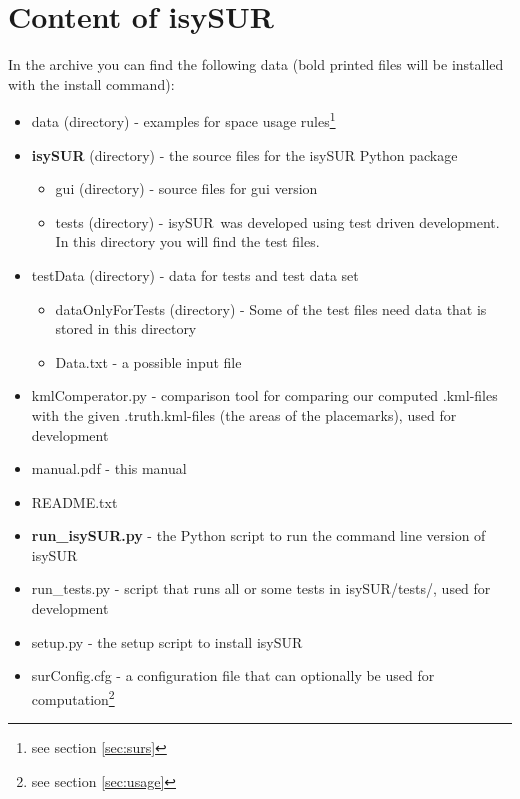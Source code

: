 \documentclass[11pt,fleqn]{book} %
\newcommand{\ProjectTitle}{isySUR}
\newcommand{\pt}{\ProjectTitle}
\begin{document}
\section{Content of \ProjectTitle}
In the archive you can find the following data (bold printed files will be installed with the install command):
\begin{itemize}
	\item data (directory) - examples for space usage rules\footnote{see section \ref{sec:surs}}
	\item \textbf{isySUR} (directory) - the source files for the isySUR Python package
	\begin{itemize}
		\item gui (directory) - source files for gui version
		\item tests (directory) - \pt\ was developed using test driven development. In this directory you will find the test files.
	\end{itemize}
	\item testData (directory) - data for tests and test data set
	\begin{itemize}
		\item dataOnlyForTests (directory) - Some of the test files need data that is stored in this directory
		\item Data.txt - a possible input file
	\end{itemize}
	\item kmlComperator.py - comparison tool for comparing our computed .kml-files with the given .truth.kml-files (the areas of the placemarks), used for development
	\item manual.pdf - this manual
	\item README.txt
	\item \textbf{run\_isySUR.py} - the Python script to run the command line version of \pt
	\item run\_tests.py - script that runs all or some tests in isySUR/tests/, used for development
	\item setup.py - the setup script to install \pt
	\item surConfig.cfg - a configuration file that can optionally be used for computation\footnote{see section \ref{sec:usage}}
\end{itemize}


\end{document}

